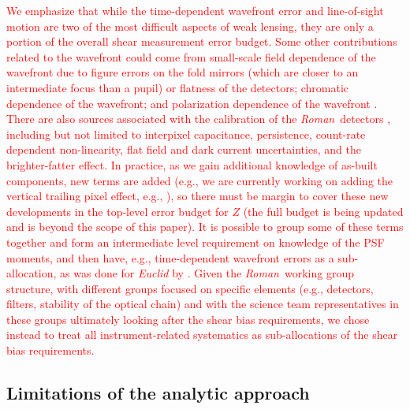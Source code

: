 \documentclass[usenatbib]{mnras}
\newcommand{\wfirst}{{\slshape Roman}}
\newcommand{\changetext}[1]{\textcolor{red}{#1}}
\begin{document}
\changetext{We emphasize that while the time-dependent wavefront error and line-of-sight motion are two of the most difficult aspects of weak lensing, they are only a portion of the overall shear measurement error budget. Some other contributions related to the wavefront could come from small-scale field dependence of the wavefront due to figure errors on the fold mirrors (which are closer to an intermediate focus than a pupil) or flatness of the detectors; chromatic dependence of the wavefront; and polarization dependence of the wavefront \citep{2020MNRAS.tmp.1430L}. There are also sources associated with the calibration of the \wfirst\ detectors \citep{2020arXiv200500505M}, including but not limited to interpixel capacitance, persistence, count-rate dependent non-linearity, flat field and dark current uncertainties, and the brighter-fatter effect. In practice, as we gain additional knowledge of as-built components, new terms are added (e.g., we are currently working on adding the vertical trailing pixel effect, e.g., \citealt{2020arXiv200305978F}), so there must be margin to cover these new developments in the top-level error budget for $Z$ (the full budget is being updated and is beyond the scope of this paper). It is possible to group some of these terms together and form an intermediate level requirement on knowledge of the PSF moments, and then have, e.g., time-dependent wavefront errors as a sub-allocation, as was done for {\slshape Euclid} by \citet{2013MNRAS.431.3103C}. Given the \wfirst\ working group structure, with different groups focused on specific elements (e.g., detectors, filters, stability of the optical chain) and with the science team representatives in these groups ultimately looking after the shear bias requirements, we chose instead to treat all instrument-related systematics as sub-allocations of the shear bias requirements.}

\subsection{Limitations of the analytic approach}
\end{document}
